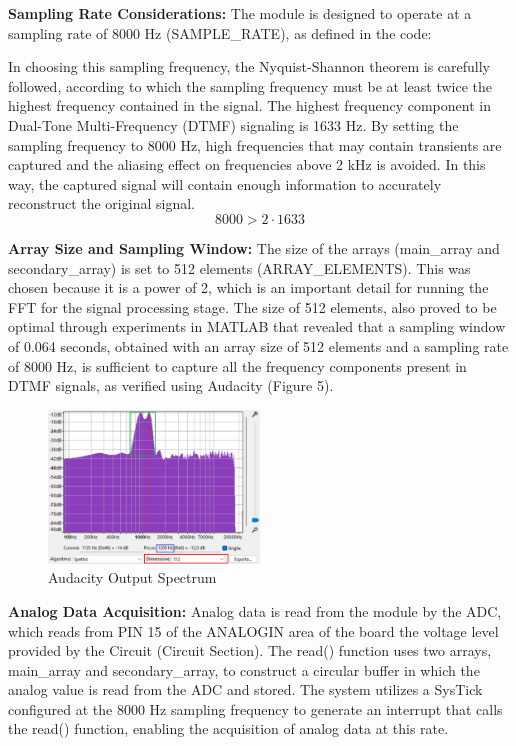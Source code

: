 \documentclass{cce2014-design}
\begin{document}
{{	  \textbf{Sampling Rate Considerations:}
	  The module is designed to operate at a sampling rate of 8000 Hz
	  (SAMPLE\_RATE), as defined in the code:

	  In choosing this sampling frequency, the Nyquist-Shannon
	  theorem is carefully followed, according to which the sampling
	  frequency must
	  be at least twice the highest frequency contained in the signal. The
	  highest
	  frequency component in Dual-Tone Multi-Frequency (DTMF) signaling is
	  1633 Hz.
	  By setting the sampling frequency to 8000 Hz, high frequencies that
	  may contain
	  transients are captured and the aliasing effect on frequencies above
	  2 kHz is
	  avoided. In this way, the captured signal will contain enough
	  information to
	  accurately reconstruct the original signal.
	  \begin{equation}
		  8000 > 2 \cdot 1633
	  \end{equation}

	  \textbf{Array Size and Sampling Window:}
	  The size of the arrays (main\_array and secondary\_array) is
	  set to 512 elements (ARRAY\_ELEMENTS). This was chosen because it is
	  a power of
	  2, which is an important detail for running the FFT for the signal
	  processing
	  stage. The size of 512 elements, also proved to be optimal through
	  experiments
	  in MATLAB that revealed that a sampling window of 0.064 seconds,
	  obtained with
	  an array size of 512 elements and a sampling rate of 8000 Hz, is
	  sufficient to
	  capture all the frequency components present in DTMF signals, as
	  verified using
	  Audacity (Figure 5).
	  \begin{figure}[H]
		  \centering
		  \includegraphics[width=0.5\textwidth]{spectrum-window}
		  \caption{Audacity Output Spectrum}
		  \label{fig: Spectrum (Window Size: 0.064s, Sampling Rate:
			  8000Hz)}
	  \end{figure}

	  \textbf{Analog Data Acquisition:}
	  Analog data is read from the module by the ADC, which reads from
	  PIN 15 of the ANALOGIN area of the board the voltage level
	  provided by the Circuit (Circuit Section).
	  The read() function uses two arrays,
	  main\_array and secondary\_array, to construct a circular buffer
	  in which the analog value is read from the ADC and stored.
	  The system utilizes a SysTick configured at the 8000 Hz sampling
	  frequency to generate an interrupt that calls the read() function,
	  enabling the acquisition of analog data at this rate.

}}
\end{document}
